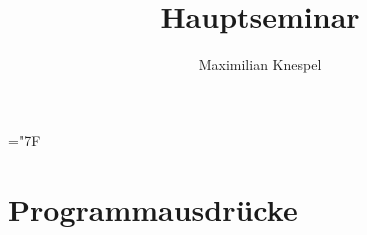 \documentclass[german,bibnum,beleg,zihtitle,german,hyperref,utf8]{zihpub}
\author{Maximilian Knespel}
\title{Hauptseminar}
\date{}
\begin{document}
\hyphenchar\font=\string"7F %












\appendix




\chapter{Programmausdrücke}





\end{document}
